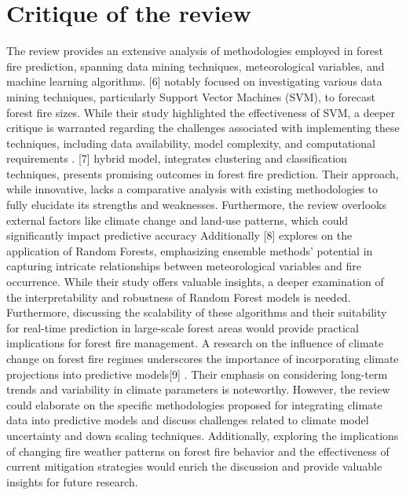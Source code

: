 \section{Critique of the review}
\label{sec:into_back} 
The review provides an extensive analysis of methodologies employed in forest fire prediction, spanning data mining techniques, meteorological variables, and machine learning algorithms. [6] notably focused on investigating various data mining techniques, particularly Support Vector Machines (SVM), to forecast forest fire sizes. While their study highlighted the effectiveness of SVM, a deeper critique is warranted regarding the challenges associated with implementing these techniques, including data availability, model complexity, and computational requirements . [7] hybrid model, integrates clustering and classification techniques, presents promising outcomes in forest fire prediction. Their approach, while innovative, lacks a comparative analysis with existing methodologies to fully elucidate its strengths and weaknesses. Furthermore, the review overlooks external factors like climate change and land-use patterns, which could significantly impact predictive accuracy
Additionally [8] explores on the application of Random
Forests, emphasizing ensemble methods' potential in capturing intricate relationships between meteorological variables and
fire occurrence. While their study offers valuable insights, 
a deeper examination of the interpretability and robustness 
of Random Forest models is needed. Furthermore, discussing 
the scalability of these algorithms and their suitability for
real-time prediction in large-scale forest areas would 
provide practical implications for forest fire management. A 
research on the influence of climate change on forest fire 
regimes underscores the importance of incorporating climate 
projections into predictive models[9] . Their emphasis on 
considering long-term trends and variability in climate parameters is noteworthy. However, the review could elaborate 
on the specific methodologies proposed for integrating 
climate data into predictive models and discuss challenges
related to climate model uncertainty and down scaling 
techniques. Additionally, exploring the implications of 
changing fire weather patterns on forest fire behavior and 
the effectiveness of current mitigation strategies would enrich the discussion and provide valuable insights for
future research.

